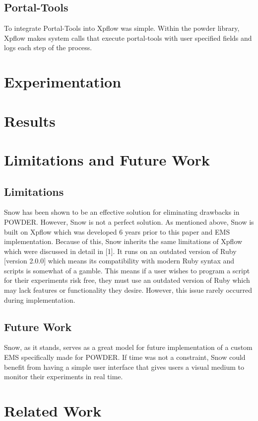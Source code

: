\documentclass[11pt,twocolumn,letterpaper]{article}
\begin{document}
\subsection{Portal-Tools}
\quad To integrate Portal-Tools into Xpflow was simple.  Within the powder library, Xpflow makes system calls that execute portal-tools with user specified fields and logs each step of the process. \newline
\section{Experimentation}
\section{Results}
\section{Limitations and Future Work}

\subsection{Limitations} Snow has been shown to be an effective solution for eliminating drawbacks in POWDER.  However, Snow  is not a perfect solution.  As mentioned above, Snow is built on Xpflow which was developed 6 years prior to this paper and EMS implementation. Because of this, Snow inherits the same limitations of Xpflow which were discussed in detail in [1].  It runs on an outdated version of Ruby [version 2.0.0] which means its compatibility with modern Ruby syntax and scripts is somewhat of a gamble.  This means if a user wishes to program a script for their experiments risk free, they must use an outdated version of Ruby which may lack features or functionality they desire.   However, this issue rarely occurred during implementation.   \newline

\subsection{Future Work} Snow, as it stands, serves as a great model for future implementation of a custom EMS specifically made for POWDER.  If time was not a constraint, Snow could benefit from having a simple user interface that gives users a visual medium to monitor their experiments in real time.  

\section{Related Work}
\end{document}

